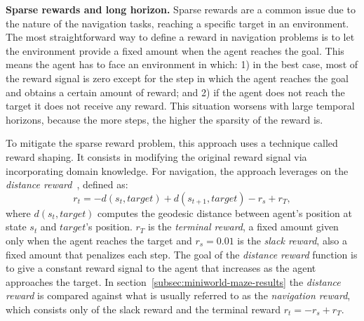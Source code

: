 \textbf{Sparse rewards and long horizon.}
Sparse rewards are a common issue due to the nature of the navigation tasks, \ie reaching a specific target in an environment.
The most straightforward way to define a reward in navigation problems is to let the environment provide a fixed amount when the agent reaches the goal.
This means the agent has to face an environment in which:
1) in the best case, most of the reward signal is zero except for the step in which the agent reaches the goal and obtains a certain amount of reward;
and 2) if the agent does not reach the target it does not receive any reward.
This situation worsens with large temporal horizons, because the more steps, the higher the sparsity of the reward is.

To mitigate the sparse reward problem, this approach uses a technique called reward shaping.
It consists in modifying the original reward signal via incorporating domain knowledge.
For navigation, the approach leverages on the \textit{distance reward}~\cite{wijmans2020}, defined as:
\begin{equation}
    \label{eq:rew_shaping}
    r_t = -d(s_t, target) + d(s_{t+1}, target) - r_s + r_T,
\end{equation}
where $d(s_t, target)$ computes the geodesic distance between agent's position at state $s_t$ and $target$'s position.
$r_T$ is the \textit{terminal reward}, a fixed amount given only when the agent reaches the target and $r_s=0.01$ is the \textit{slack reward}, also a fixed amount that penalizes each step.
The goal of the \textit{distance reward} function is to give a constant reward signal to the agent that increases as the agent approaches the target.
In section~\ref{subsec:miniworld-maze-results} the \textit{distance reward} is compared against what is usually referred to as the \textit{navigation reward}, which consists only of the slack reward and the terminal reward $r_t = -r_s + r_T$.

